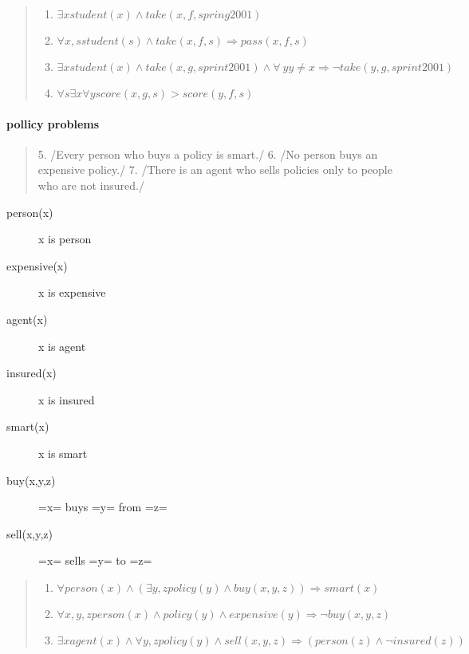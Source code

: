 \begin{quote}
  \begin{enumerate}
  \item $\exists x student(x) \wedge take(x,f,spring2001)$
  \item $\forall x,s student(s) \wedge take(x,f,s) \Rightarrow pass(x,f,s)$
  \item $\exists x student(x) \wedge take(x,g,sprint2001) \wedge \forall \: y y \ne x \Rightarrow \neg take(y,g,sprint2001)$
  \item $\forall s \exists x \forall y score(x,g,s) > score(y,f,s)$
  \end{enumerate}
\end{quote}

\paragraph{pollicy problems}

\begin{quote}
    5. /Every person who buys a policy is smart./
    6. /No person buys an expensive policy./
    7. /There is an agent who sells policies only to people who are not insured./
\end{quote}

\begin{description}
\item [person(x)] x is person
\item [expensive(x)] x is expensive
\item [agent(x)] x is agent
\item [insured(x)] x is insured
\item [smart(x)] x is smart
\item [buy(x,y,z)] =x= buys =y= from =z=
\item [sell(x,y,z)] =x= sells =y= to =z=
\end{description}

\begin{quote}
  \begin{enumerate}
  \item $\forall person(x) \wedge (\exists y,z policy(y) \wedge buy(x,y,z)) \Rightarrow smart(x)$
  \item $\forall x,y,z person(x) \wedge policy(y) \wedge expensive(y) \Rightarrow \neg buy(x,y,z)$
  \item $\exists x agent(x) \wedge \forall y,z policy(y) \wedge sell(x,y,z) \Rightarrow (person(z) \wedge \neg insured(z))$
  \end{enumerate}
\end{quote}

